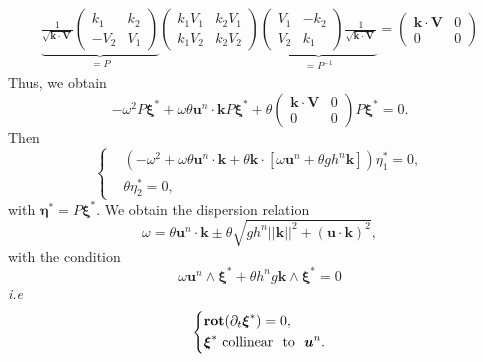 \documentclass[a4paper, 11pt]{article}
\begin{document}
\begin{equation*}
\begin{split}
\underbrace{\frac{1}{\sqrt{\boldsymbol{k}\cdot \boldsymbol{V}}}
\begin{pmatrix}
k_1&k_2\\-V_2&V_1
\end{pmatrix}}_{=P}\begin{pmatrix}k_1V_1&k_2V_1\\k_1V_2&k_2V_2\end{pmatrix}\underbrace{\begin{pmatrix}V_1&-k_2\\V_2&k_1\end{pmatrix}\frac{1}{\sqrt{\boldsymbol{k}\cdot \boldsymbol{V}}}}_{=P^{-1}}=\begin{pmatrix}\boldsymbol{k}\cdot \boldsymbol{V}&0\\0&0\end{pmatrix}
\end{split}
\end{equation*}
Thus, we obtain
\begin{equation*}
-\omega^2P\boldsymbol{\xi}^*+\omega\theta \boldsymbol{u}^n\cdot \boldsymbol{k}P\boldsymbol{\xi}^*+\theta\begin{pmatrix}\boldsymbol{k}\cdot \boldsymbol{V}&0\\0&0\end{pmatrix}P\boldsymbol{\xi}^*=0.
\end{equation*}
Then
\begin{equation*}
\left\{
\begin{split}
&\left(-\omega^2+\omega \theta\boldsymbol{u}^n\cdot \boldsymbol{k}+\theta\boldsymbol{k}\cdot \left[\omega \boldsymbol{u}^n+\theta gh^n\boldsymbol{k}\right]\right)\eta_1^*=0,\\
&\theta \eta_2^*=0,
\end{split}\right.
\end{equation*}
with $\boldsymbol{\eta}^*=P\boldsymbol{\xi}^*$.
We obtain the dispersion relation
\begin{equation*}
\omega=\theta\boldsymbol{u}^n\cdot \boldsymbol{k}\pm\theta\sqrt{gh^n||\boldsymbol{k}||^2+\left(\boldsymbol{u}\cdot \boldsymbol{k}\right)^2},
\end{equation*} 
with the condition
\begin{equation*}
\omega \boldsymbol{u}^n\wedge \boldsymbol{\xi}^*+\theta h^ng\boldsymbol{k}\wedge \boldsymbol{\xi}^*=0
\end{equation*}
\textit{i.e}
\begin{equation*}
\left\{
\begin{split}
&\text{\textbf{rot}}(\partial_t\boldsymbol{\xi}^*)=0,\\
&\boldsymbol{\xi}^* \text{\ collinear \ to \ }\boldsymbol{u}^n.
\end{split}
\right.
\end{equation*}
\end{document}
